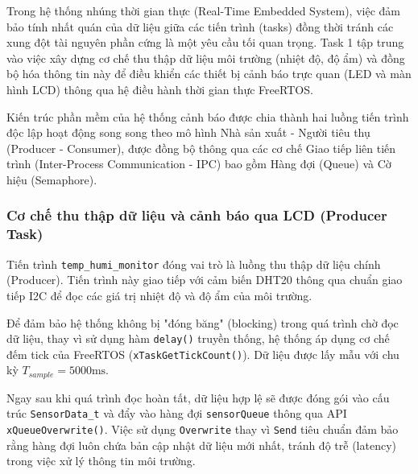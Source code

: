 
Trong hệ thống nhúng thời gian thực (Real-Time Embedded System), việc đảm bảo tính nhất quán của dữ liệu giữa các tiến trình (tasks) đồng thời tránh các xung đột tài nguyên phần cứng là một yêu cầu tối quan trọng. Task 1 tập trung vào việc xây dựng cơ chế thu thập dữ liệu môi trường (nhiệt độ, độ ẩm) và đồng bộ hóa thông tin này để điều khiển các thiết bị cảnh báo trực quan (LED và màn hình LCD) thông qua hệ điều hành thời gian thực FreeRTOS.

Kiến trúc phần mềm của hệ thống cảnh báo được chia thành hai luồng tiến trình độc lập hoạt động song song theo mô hình Nhà sản xuất - Người tiêu thụ (Producer - Consumer), được đồng bộ thông qua các cơ chế Giao tiếp liên tiến trình (Inter-Process Communication - IPC) bao gồm Hàng đợi (Queue) và Cờ hiệu (Semaphore).

\subsubsection{Cơ chế thu thập dữ liệu và cảnh báo qua LCD (Producer Task)}
Tiến trình \texttt{temp\_humi\_monitor} đóng vai trò là luồng thu thập dữ liệu chính (Producer). Tiến trình này giao tiếp với cảm biến DHT20 thông qua chuẩn giao tiếp I2C để đọc các giá trị nhiệt độ và độ ẩm của môi trường. 

Để đảm bảo hệ thống không bị "đóng băng" (blocking) trong quá trình chờ đọc dữ liệu, thay vì sử dụng hàm \texttt{delay()} truyền thống, hệ thống áp dụng cơ chế đếm tick của FreeRTOS (\texttt{xTaskGetTickCount()}). Dữ liệu được lấy mẫu với chu kỳ $T_{sample} = 5000\text{ms}$. 

Ngay sau khi quá trình đọc hoàn tất, dữ liệu hợp lệ sẽ được đóng gói vào cấu trúc \texttt{SensorData\_t} và đẩy vào hàng đợi \texttt{sensorQueue} thông qua API \texttt{xQueueOverwrite()}. Việc sử dụng \texttt{Overwrite} thay vì \texttt{Send} tiêu chuẩn đảm bảo rằng hàng đợi luôn chứa bản cập nhật dữ liệu mới nhất, tránh độ trễ (latency) trong việc xử lý thông tin môi trường.

